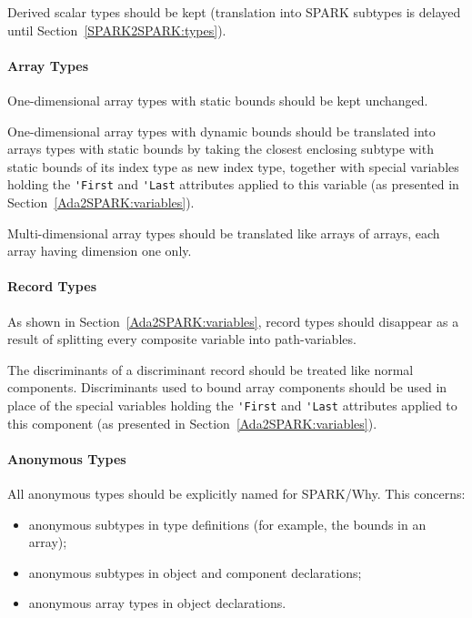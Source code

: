 \documentclass{article}
\newcounter{example}
\begin{document}
Derived scalar types should be kept (translation into SPARK subtypes is delayed
until Section~\ref{SPARK2SPARK:types}).

\paragraph{Array Types}

One-dimensional array types with static bounds should be kept unchanged.

One-dimensional array types with dynamic bounds should be translated into
arrays types with static bounds by taking the closest enclosing subtype with
static bounds of its index type as new index type, together with special
variables holding the \verb|'First| and \verb|'Last| attributes applied to this
variable (as presented in Section~\ref{Ada2SPARK:variables}).

Multi-dimensional array types should be translated like arrays of arrays, each
array having dimension one only.

\paragraph{Record Types}

As shown in Section~\ref{Ada2SPARK:variables}, record types should disappear
as a result of splitting every composite variable into path-variables.

The discriminants of a discriminant record should be treated like normal
components. Discriminants used to bound array components should be used in
place of the special variables holding the \verb|'First| and \verb|'Last|
attributes applied to this component (as presented in
Section~\ref{Ada2SPARK:variables}). 

\paragraph{Anonymous Types}

All anonymous types should be explicitly named for SPARK/Why. This concerns:
\begin{itemize}
\item anonymous subtypes in type definitions (for example, the bounds in an
  array);
\item anonymous subtypes in object and component declarations;
\item anonymous array types in object declarations.
\end{itemize}
\end{document}
